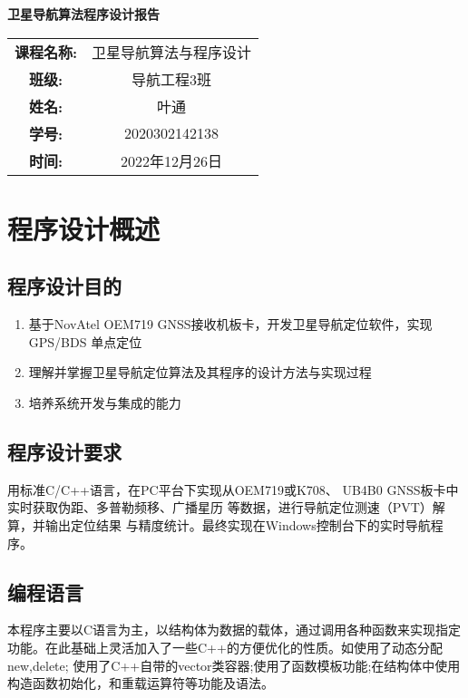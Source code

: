 \documentclass{ctexart}
\begin{document}
\newpage
\thispagestyle{empty}
    \begin{center}
        \Huge\textbf{卫星导航算法程序设计报告}
    \end{center}
\vspace*{\fill}

\begin{table}[h]
    \centering
    \large
    \begin{tabular}{cc}
    \textbf{课程名称:} & 卫星导航算法与程序设计 \\ \cline{2-2}
    \textbf{班级:} & 导航工程3班 \\ \cline{2-2}
    \textbf{姓名:} & 叶通 \\  \cline{2-2}
    \textbf{学号:} & 2020302142138 \\ \cline{2-2}
    \textbf{时间:} & 2022年12月26日 \\ \cline{2-2}
    \end{tabular}
\end{table}

\newpage
{}
\setcounter{page}{1}
\tableofcontents

\newpage
\setcounter{page}{1}

\section{程序设计概述}
\subsection{程序设计目的}
\begin{enumerate}[(1)]
\item 基于NovAtel OEM719 GNSS接收机板卡，开发卫星导航定位软件，实现GPS/BDS
单点定位
\item 理解并掌握卫星导航定位算法及其程序的设计方法与实现过程
\item 培养系统开发与集成的能力
\end{enumerate}
\subsection{程序设计要求}
\label{1.2}
用标准C/C++语言，在PC平台下实现从OEM719或K708、
UB4B0 GNSS板卡中实时获取伪距、多普勒频移、广播星历
等数据，进行导航定位测速（PVT）解算，并输出定位结果
与精度统计。最终实现在Windows控制台下的实时导航程序。
\subsection{编程语言}
本程序主要以C语言为主，以结构体为数据的载体，通过调用各种函数来实现指定功能。在此基础上灵活加入了一些C++的方便优化的性质。如使用了动态分配new,delete;
使用了C++自带的vector类容器;使用了函数模板功能;在结构体中使用构造函数初始化，和重载运算符等功能及语法。
\end{document}
